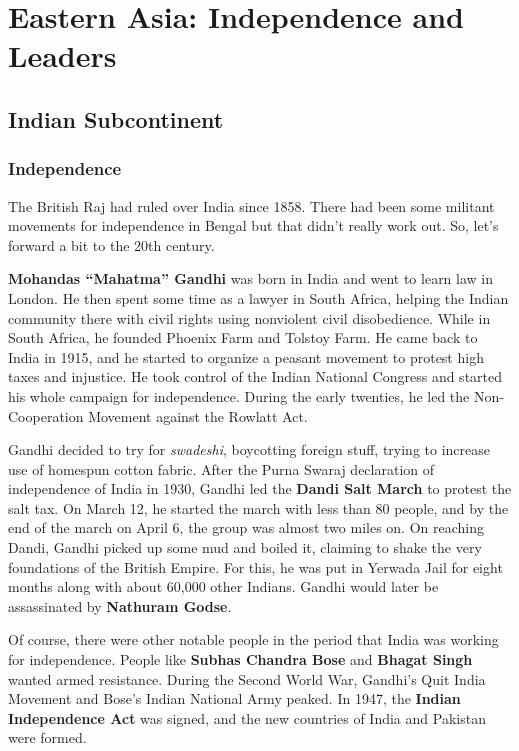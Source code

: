 \section{Eastern Asia: Independence and Leaders}

\subsection*{Indian Subcontinent}

\subsubsection*{Independence}

The British Raj had ruled over India since 1858.
There had been some militant movements for independence in Bengal but that didn't really work out.
So, let's forward a bit to the 20th century.

\textbf{Mohandas ``Mahatma'' Gandhi} was born in India and went to learn law in London.
He then spent some time as a lawyer in South Africa,
helping the Indian community there with civil rights using nonviolent civil disobedience.
While in South Africa, he founded Phoenix Farm and Tolstoy Farm.
He came back to India in 1915, and he started to organize a peasant movement to protest high taxes and injustice.
He took control of the Indian National Congress and started his whole campaign for independence.
During the early twenties, he led the Non-Cooperation Movement against the Rowlatt Act.

Gandhi decided to try for \textit{swadeshi}, boycotting foreign stuff,
trying to increase use of homespun cotton fabric.
After the Purna Swaraj declaration of independence of India in 1930,
Gandhi led the \textbf{Dandi Salt March} to protest the salt tax.
On March 12, he started the march with less than 80 people,
and by the end of the march on April 6, the group was almost two miles on.
On reaching Dandi, Gandhi picked up some mud and boiled it,
claiming to shake the very foundations of the British Empire.
For this, he was put in Yerwada Jail for eight months along with about 60,000 other Indians.
Gandhi would later be assassinated by \textbf{Nathuram Godse}.

Of course, there were other notable people in the period that India was working for independence.
People like \textbf{Subhas Chandra Bose} and \textbf{Bhagat Singh} wanted armed resistance.
During the Second World War, Gandhi's Quit India Movement and Bose's Indian National Army peaked.
In 1947, the \textbf{Indian Independence Act} was signed, and the new countries of India and Pakistan were formed.

